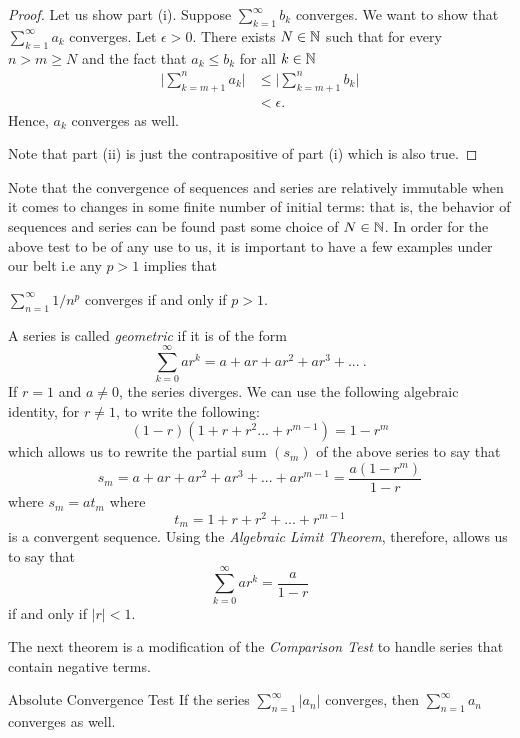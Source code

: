 \begin{proof}
Let us show part (i). Suppose \( \sum_{k=1}^{\infty} b_k \) converges. We want to show that \( \sum_{k=1}^{\infty} a_k\) converges. Let \( \epsilon > 0 \). There exists \( N \in \mathbb{N} \) such that for every \( n > m \geq N \) and the fact that \( a_k \leq b_k\) for all \(k \in \mathbb{N} \) 
\begin{align*}
    \Big|\sum_{k=m+1}^{n} a_k \Big| &\leq \Big|\sum_{k=m+1}^{n}b_k\Big| \\ 
                                    &< \epsilon.
\end{align*}
Hence, \(a_k\) converges as well. 

Note that part (ii) is just the contrapositive of part (i) which is also true. 
\end{proof}

Note that the convergence of sequences and series are relatively immutable when it comes to changes in some finite number of initial terms: that is, the behavior of sequences and series can be found past some choice of \( N \in \mathbb{N} \). In order for the above test to be of any use to us, it is important to have a few examples under our belt i.e any \( p > 1 \) implies that 
\begin{center}
    \( \sum_{n=1}^{\infty} 1/ n^p\) converges if and only if \( p > 1\).    
\end{center}

\begin{example}{}{}
A series is called \textit{geometric} if it is of the form 
\[ \sum_{k=0}^{\infty} ar^k = a + ar + ar^2 + ar^3 + ... ~ .\]
If \( r = 1 \) and \( a \neq  0\), the series diverges. We can use the following algebraic identity, for \( r \neq 1 \), to write the following: 
\[ (1-r)(1 + r + r^2 ... + r^{m-1}) = 1 - r^m\]
which allows us to rewrite the partial sum \( (s_m)\) of the above series to say that 
\[ s_m = a+ ar + ar^2 + ar^3 + ... + a r^{m-1} = \frac{a(1-r^m)}{1-r}\]
where \( s_m = at_{m}\) where 
\[ t_m = 1 + r + r^2 + ... + r^{m-1}\]
is a convergent sequence.
Using the \textit{Algebraic Limit Theorem}, therefore, allows us to say that 
\[ \sum_{k=0}^{\infty} ar^k = \frac{a}{1-r}\]
if and only if \( |r| < 1\).
\end{example}

The next theorem is a modification of the \textit{Comparison Test} to handle series that contain negative terms.

\begin{theorem}{Absolute Convergence Test}{}
    If the series \( \sum_{n=1}^{\infty} |a_n| \) converges, then \( \sum_{n=1}^{\infty} a_n\) converges as well.
\end{theorem}

